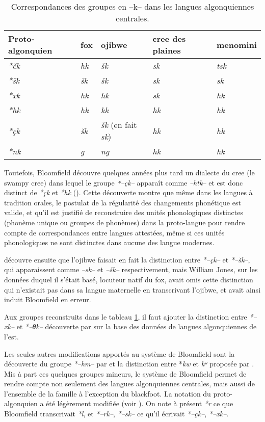 \documentclass[twoside,a4paper,11pt]{article}
\newcommand{\ipa}[1]{{\phon\textit{#1}}}
\newcommand{\Σ}{\greek{Σ}}
\begin{document}
\begin{table}[h]
\caption{Correspondances des groupes en --k-- dans les langues algonquiennes centrales.} \centering  \label{tab:clusters.k}
\begin{tabular}{lllll}
\toprule
Proto-algonquien & fox & ojibwe & cree des plaines & menomini \\
\midrule
\ipa{*čk} & \ipa{hk} & \ipa{šk} & \ipa{sk} & \ipa{tsk} \\
\ipa{*šk} & \ipa{šk} & \ipa{šk} & \ipa{sk} & \ipa{sk} \\
\ipa{*xk} & \ipa{hk} & \ipa{hk} & \ipa{sk} & \ipa{hk} \\
\ipa{*hk} & \ipa{hk} & \ipa{kk} & \ipa{hk} & \ipa{hk} \\
\ipa{*çk} & \ipa{šk} & \ipa{šk} (en fait \ipa{sk}) & \ipa{hk} & \ipa{hk} \\
\ipa{*nk} & \ipa{g} & \ipa{ng} & \ipa{hk} & \ipa{hk} \\
\bottomrule
\end{tabular}
\end{table}

Toutefois, Bloomfield découvre quelques années plus tard un dialecte du cree (le swampy cree) dans lequel le groupe \ipa{*--çk--} apparaît comme \ipa{--htk--} et est donc distinct de \ipa{*çk}  et \ipa{*hk} (\citealt{bloomfield28thk}). Cette découverte montre que même dans les langues à tradition orales, le postulat de la régularité des changements phonétique est valide, et qu'il est justifié de reconstruire des unités phonologiques distinctes (phonème unique ou groupes de phonèmes) dans la proto-langue pour rendre compte de correspondances entre langues attestées, même si ces unités phonologiques ne sont distinctes dans aucune des langue modernes. 

\citet{bloomfield46proto} découvre ensuite que l'ojibwe faisait en fait la distinction entre  \ipa{*--çk--} et \ipa{*--šk--}, qui apparaissent comme \ipa{--sk--} et \ipa{--šk--} respectivement, mais William Jones, sur les données duquel il s'était basé, locuteur natif du fox, avait omis cette distinction qui n'existait pas dans sa langue maternelle en transcrivant l'ojibwe, et avait ainsi induit Bloomfield en erreur.

Aux groupes reconstruits dans le tableau \ref{tab:clusters.k}, il faut ajouter la distinction entre \ipa{*--xk--} et \ipa{*--θk--} découverte par \citet{siebert41clusters} sur la base des données de langues algonquiennes de l'est. 

Les seules autres modifications apportés au système de Bloomfield sont la découverte du groupe  \ipa{*--hm--} par \citet{goddard79comparative} et la distinction entre *\ipa{kw} et \ipa{kʷ} proposée par \citet{pentland79phd}. Mis à part ces quelques groupes mineurs, le système   de Bloomfield permet de rendre compte non seulement des langues algonquiennes centrales, mais aussi de l'ensemble de la famille à l'exception du blackfoot. La notation du proto-algonquien a été légèrement modifiée (voir \citealt{goddard98arapaho}). On note à présent \ipa{*r} ce que Bloomfield transcrivait \ipa{*l}, et \ipa{*--rk--},  \ipa{*--sk--} ce qu'il écrivait \ipa{*--çk--},  \ipa{*--xk--}.
\end{document}
